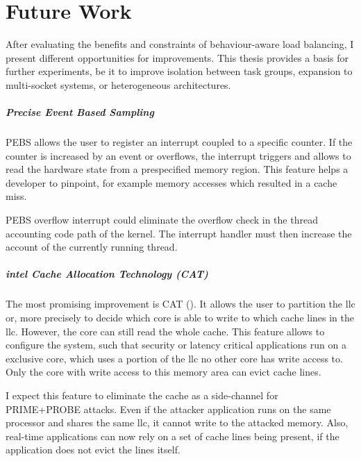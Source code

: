 \chapter{Future Work}
\label{sec:futurework}


After evaluating the benefits and constraints of behaviour-aware load
balancing, I present different opportunities for improvements.
This thesis provides a basis for further experiments, be it to improve
isolation between task groups, expansion to multi-socket systems, or
heterogeneous architectures.

\paragraph{Precise Event Based Sampling}
PEBS allows the user to register an interrupt coupled to a specific counter.
If the counter is increased by an event or overflows, the interrupt triggers
and allows to read the hardware state from a prespecified memory region.
This feature helps a developer to pinpoint, for example memory accesses which
resulted in a cache miss.

PEBS overflow interrupt could eliminate the overflow check in the thread
accounting code path of the kernel.
The interrupt handler must then increase the account of the currently running
thread.

\paragraph{\gls{intel} Cache Allocation Technology (CAT)}
The most promising improvement is CAT (\cite{intel_cat}).
It allows the user to partition the \gls{llc} or, more precisely to decide
which core is able to write to which cache lines in the \gls{llc}.
However, the core can still read the whole cache.
This feature allows to configure the system, such that security or latency
critical applications run on a exclusive core, which uses a portion of the
\gls{llc} no other core has write access to.
Only the core with write access to this memory area can evict cache lines.

I expect this feature to eliminate the cache as a side-channel for PRIME+PROBE
attacks.
Even if the attacker application runs on the same processor and shares the same
\gls{llc}, it cannot write to the attacked memory.
Also, real-time applications can now rely on a set of cache lines being
present, if the application does not evict the lines itself.

